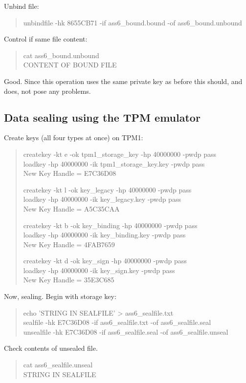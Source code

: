 \documentclass[10pt]{article}
\begin{document}
Unbind file:
\begin{quote}
unbindfile -hk 8655CB71 -if ass6\_bound.bound -of ass6\_bound.unbound
\end{quote}

Control if same file content:
\begin{quote}
cat ass6\_bound.unbound \\
CONTENT OF BOUND FILE
\end{quote}

Good. Since this operation uses the same private key as before this should,
and does, not pose any problems.

\subsection{Data sealing using the TPM emulator}
Create keys (all four types at once) on TPM1:
\begin{quote}
createkey -kt e -ok tpm1\_storage\_key -hp 40000000 -pwdp pass \\
loadkey -hp 40000000 -ik tpm1\_storage\_key.key -pwdp pass \\
New Key Handle = E7C36D08

createkey -kt l -ok key\_legacy -hp 40000000 -pwdp pass \\
loadkey -hp 40000000 -ik key\_legacy.key -pwdp pass \\
New Key Handle = A5C35CAA

createkey -kt b -ok key\_binding -hp 40000000 -pwdp pass \\
loadkey -hp 40000000 -ik key\_binding.key -pwdp pass \\
New Key Handle = 4FAB7659

createkey -kt d -ok key\_sign -hp 40000000 -pwdp pass \\
loadkey -hp 40000000 -ik key\_sign.key -pwdp pass \\
New Key Handle = 35E3C685
\end{quote}

Now, sealing. Begin with storage key:
\begin{quote}
echo 'STRING IN SEALFILE' > ass6\_sealfile.txt \\
sealfile -hk E7C36D08 -if ass6\_sealfile.txt -of ass6\_sealfile.seal \\
unsealfile -hk E7C36D08 -if ass6\_sealfile.seal -of ass6\_sealfile.unseal
\end{quote}

Check contents of unsealed file.
\begin{quote}
cat ass6\_sealfile.unseal \\
STRING IN SEALFILE
\end{quote}
\end{document}
